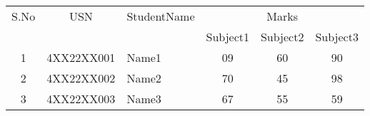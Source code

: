 \documentclass{article}
\begin{document}
\begin{table}[h]
\centering
\begin{tabular}{|c|c|l|c|c|c|}
\hline
S.No & USN & StudentName & \multicolumn{3}{c|}{Marks} \\
\cline{4-6}
 &  &  & Subject1 & Subject2 & Subject3 \\
\hline
1 & 4XX22XX001 & Name1 & 09 & 60 & 90 \\
\hline
2 & 4XX22XX002 & Name2 & 70 & 45 & 98 \\
\hline
3 & 4XX22XX003 & Name3 & 67 & 55 & 59 \\
\hline
\end{tabular}
\end{table}
\end{document}
